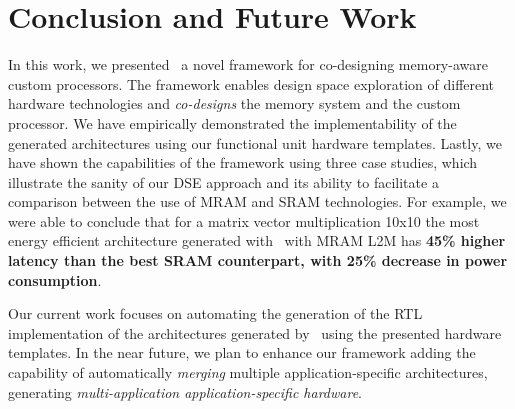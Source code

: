 \section{Conclusion and Future Work}
In this work, we presented \frameworkname~a novel framework for co-designing memory-aware custom processors.  
The framework enables design space exploration of different hardware technologies and \textit{co-designs} the memory system and the custom processor. We have empirically demonstrated the implementability of the generated architectures using our functional unit hardware templates. Lastly, we have shown the capabilities of the framework using three case studies, which illustrate the sanity of our DSE approach and its ability to facilitate a comparison between the use of MRAM and SRAM technologies.  
For example, we were able to conclude that for a matrix vector multiplication 10x10 the most energy efficient architecture generated with \frameworkname~with MRAM L2M has \textbf{45\% higher latency than the best SRAM counterpart, with 25\% decrease in power consumption}. 

Our current work focuses on automating the generation of the RTL implementation of the architectures generated by \frameworkname~using the presented hardware templates. In the near future, we plan to enhance our framework adding the capability of automatically \textit{merging} multiple application-specific architectures, generating \textit{multi-application application-specific hardware}.

